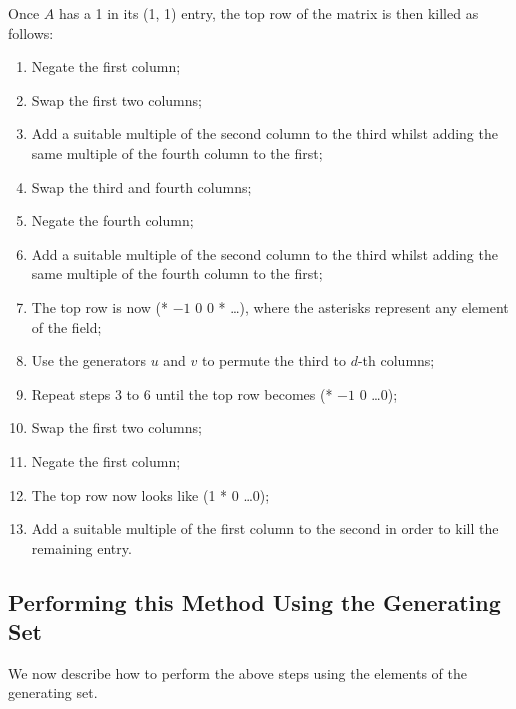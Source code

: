 \documentclass[12pt]{report}
\begin{document}
Once $A$ has a 1 in its (1, 1) entry, the top row of the matrix is then killed as follows:
\begin{enumerate}
\item Negate the first column;
\item Swap the first two columns;
\item Add a suitable multiple of the second column to the third whilst adding the same multiple of the fourth column to the first;
\item Swap the third and fourth columns;
\item Negate the fourth column;
\item Add a suitable multiple of the second column to the third whilst adding the same multiple of the fourth column to the first;
\item The top row is now (* $-1$ 0 0 * \ldots *), where the asterisks represent any element of the field;
\item Use the generators $u$ and $v$ to permute the third to $d$-th columns;
\item Repeat steps 3 to 6 until the top row becomes (* $-1$ 0 \ldots 0);
\item Swap the first two columns;
\item Negate the first column;
\item The top row now looks like (1 * 0 \ldots 0);
\item Add a suitable multiple of the first column to the second in order to kill the remaining entry.
\end{enumerate}

\subsection{Performing this Method Using the Generating Set}

We now describe how to perform the above steps using the elements of the generating set.
\end{document}
